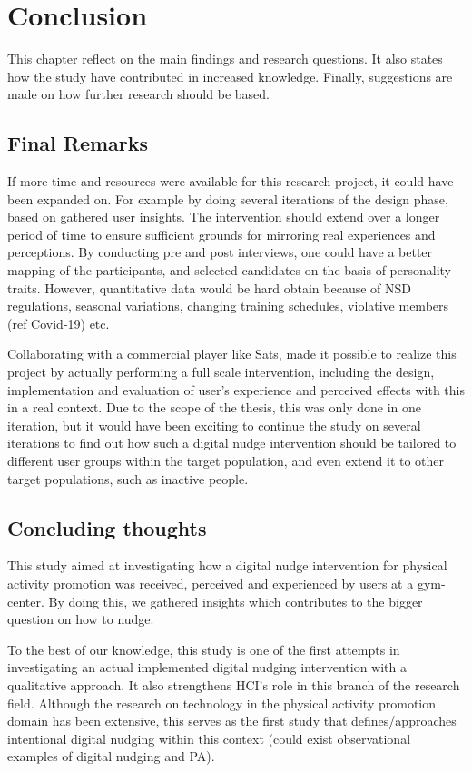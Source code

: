 \chapter{Conclusion} 
This chapter reflect on the main findings and research questions. It also states how the study have contributed in increased knowledge. Finally, suggestions are made on how further research should be based.

\section{Final Remarks}
If more time and resources were available for this research project, it could have been expanded on. For example by doing several iterations of the design phase, based on gathered user insights. The intervention should extend over a longer period of time to ensure sufficient grounds for mirroring real experiences and perceptions. By conducting pre and post interviews, one could have a better mapping of the participants, and selected candidates on the basis of personality traits. However, quantitative data would be hard obtain because of NSD regulations, seasonal variations, changing training schedules, violative members (ref Covid-19) etc.

Collaborating with a commercial player like Sats, made it possible to realize this project by actually performing a full scale intervention, including the design, implementation and evaluation of user's experience and perceived effects with this in a real context. Due to the scope of the thesis, this was only done in one iteration, but it would have been exciting to continue the study on several iterations to find out how such a digital nudge intervention should be tailored to different user groups within the target population, and even extend it to other target populations, such as inactive people. 

\section{Concluding thoughts}
This study aimed at investigating how a digital nudge intervention for physical activity promotion was received, perceived and experienced by users at a gym-center. By doing this, we gathered insights which contributes to the bigger question on how to nudge.

To the best of our knowledge, this study is one of the first attempts in investigating an actual implemented digital nudging intervention with a qualitative approach. It also strengthens HCI's role in this branch of the research field. Although the research on technology in the physical activity promotion domain has been extensive, this serves as the first study that defines/approaches intentional digital nudging within this context (could exist observational examples of digital nudging and PA). 

